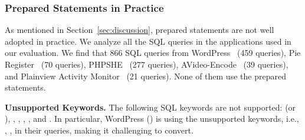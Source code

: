 

\subsubsection{Prepared Statements in Practice}
\label{appendix:enc_sql_statements}
As mentioned in Section~\ref{sec:discussion}, prepared statements are not well adopted in practice. We analyze all the SQL queries in the applications used in our evaluation. We find that 866 SQL queries from WordPress~\cite{wordpress} (459 queries), Pie Register~\cite{pieregister} (70 queries), PHPSHE~\cite{PHPSHE} (277 queries), AVideo-Encode~\cite{videoencoder} (39 queries), and Plainview Activity Monitor~\cite{PlainviewActivityMonitor} (21 queries).
None of them use the prepared statements.

\noindent
{\bf Unsupported Keywords.}
The following SQL keywords are not supported:  (or ), , , , , and .
In particular, WordPress () is using the unsupported keywords, i.e., , , in their queries, making it challenging to convert.


